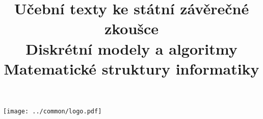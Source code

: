 \clearpage

\clearpage

\title{\LARGE Učební texty ke státní závěrečné zkoušce \\ Diskrétní modely a algoritmy \\ Matematické struktury informatiky}




\maketitle

\vspace{10mm}
\begin{center}
\texttt{[image: ../common/logo.pdf]}
\end{center} 

\clearpage

\clearpage

\tableofcontents








